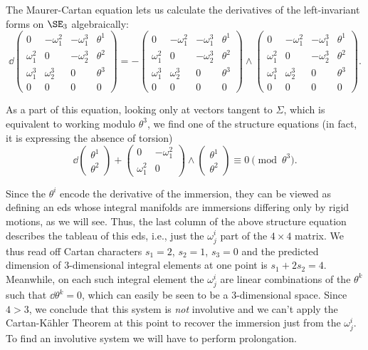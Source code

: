 The Maurer-Cartan equation lets us calculate the derivatives of the left-invariant forms on $\SE_3$ algebraically:
\[\dd \begin{pmatrix}
    0 & -\omega_1^2 & -\omega_1^3& \theta^1\\
    \omega_1^2 & 0 & -\omega_2^3 & \theta^2\\
    \omega_1^3 & \omega_2^3 & 0 & \theta^3\\
    0 & 0& 0& 0
\end{pmatrix}=-\begin{pmatrix}
    0 & -\omega_1^2 & -\omega_1^3& \theta^1\\
    \omega_1^2 & 0 & -\omega_2^3 & \theta^2\\
    \omega_1^3 & \omega_2^3 & 0 & \theta^3\\
    0 & 0& 0& 0
\end{pmatrix}\wedge \begin{pmatrix}
    0 & -\omega_1^2 & -\omega_1^3& \theta^1\\
    \omega_1^2 & 0 & -\omega_2^3 & \theta^2\\
    \omega_1^3 & \omega_2^3 & 0 & \theta^3\\
    0 & 0& 0& 0
\end{pmatrix}.\label{eq structure for surfaces}\]

As a part of this equation, looking only at vectors tangent to $\Sigma$, which is equivalent to working modulo $\theta^3$, we find one of the structure equations (in fact, it is expressing the absence of torsion)
\[\dd \begin{pmatrix}
    \theta^1 \\\theta^2
\end{pmatrix}+ 
\begin{pmatrix}
    0 & -\omega^2_1\\
    \omega^2_1 & 0
\end{pmatrix}
\wedge \begin{pmatrix}
    \theta^1 \\\theta^2
\end{pmatrix}\equiv 0\pmod{\theta^3}.\label{eq torsion-free structure on surfaces}
\]

\begin{rem}
    Since the $\theta^i$ encode the derivative of the immersion, they can be viewed as defining an \gls{eds} whose integral manifolds are immersions differing only by rigid motions, as we will see. Thus, the last column of the above structure equation describes the tableau of this \gls{eds}, i.e., just the $\omega^i_j$ part of the $4\times 4$ matrix. We thus read off Cartan characters $s_1=2$, $s_2=1$, $s_3=0$ and the predicted dimension of $3$-dimensional integral elements at one point is $s_1+2s_2=4$. Meanwhile, on each such integral element the $\omega^i_j$ are linear combinations of the $\theta^k$ such that $\dd\theta^k=0$, which can easily be seen to be a $3$-dimensional space. Since $4>3$, we conclude that this system is \emph{not} involutive and we can't apply the Cartan-K\"ahler Theorem at this point to recover the immersion just from the $\omega^i_j$. To find an involutive system we will have to perform prolongation.
\end{rem}

